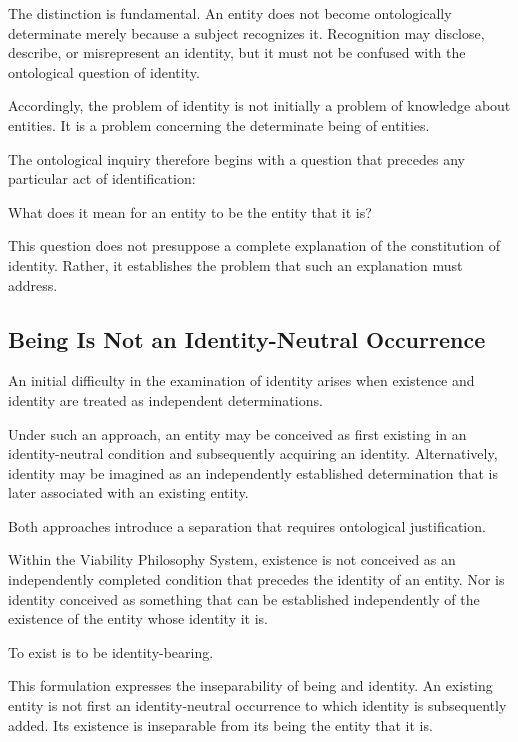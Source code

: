 The distinction is fundamental. An entity does not
become ontologically determinate merely because a subject
recognizes it. Recognition may disclose, describe, or
misrepresent an identity, but it must not be confused
with the ontological question of identity.

Accordingly, the problem of identity is not initially a
problem of knowledge about entities. It is a problem
concerning the determinate being of entities.

The ontological inquiry therefore begins with a question
that precedes any particular act of identification:

What does it mean for an entity to be the entity that it
is?

This question does not presuppose a complete explanation
of the constitution of identity. Rather, it establishes
the problem that such an explanation must address.



\subsection{Being Is Not an Identity-Neutral Occurrence}
\label{subsec:being-not-identity-neutral}

An initial difficulty in the examination of identity
arises when existence and identity are treated as
independent determinations.

Under such an approach, an entity may be conceived as
first existing in an identity-neutral condition and
subsequently acquiring an identity. Alternatively,
identity may be imagined as an independently established
determination that is later associated with an existing
entity.

Both approaches introduce a separation that requires
ontological justification.

Within the Viability Philosophy System, existence is
not conceived as an independently completed condition
that precedes the identity of an entity. Nor is identity
conceived as something that can be established
independently of the existence of the entity whose
identity it is.

To exist is to be identity-bearing.

This formulation expresses the inseparability of being
and identity. An existing entity is not first an
identity-neutral occurrence to which identity is
subsequently added. Its existence is inseparable from
its being the entity that it is.

